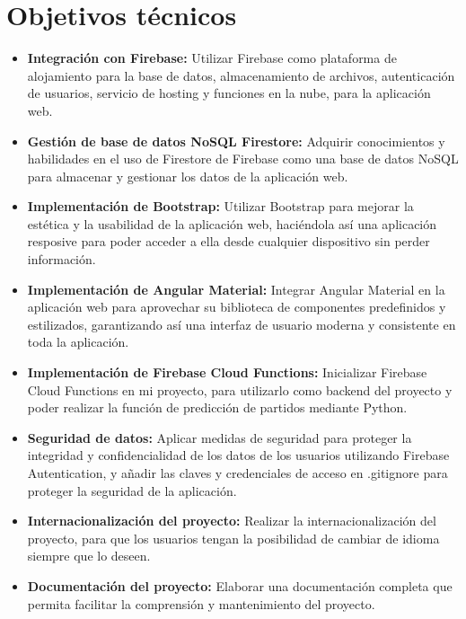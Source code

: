 \section{Objetivos técnicos}
\begin{itemize}
\tightlist
    \item
        \textbf{Integración con Firebase:} Utilizar Firebase como plataforma de alojamiento para la base de datos, almacenamiento de archivos, autenticación de usuarios, servicio de hosting y funciones en la nube, para la aplicación web.
    \item 
        \textbf{Gestión de base de datos NoSQL Firestore:} Adquirir conocimientos y habilidades en el uso de Firestore de Firebase como una base de datos NoSQL para almacenar y gestionar los datos de la aplicación web.
    \item 
        \textbf{Implementación de Bootstrap:} Utilizar Bootstrap para mejorar la estética y la usabilidad de la aplicación web, haciéndola así una aplicación resposive para poder acceder a ella desde cualquier dispositivo sin perder información.
    \item 
        \textbf{Implementación de Angular Material:} Integrar Angular Material en la aplicación web para aprovechar su biblioteca de componentes predefinidos y estilizados, garantizando así una interfaz de usuario moderna y consistente en toda la aplicación.
    \item 
        \textbf{Implementación de Firebase Cloud Functions:} Inicializar Firebase Cloud Functions en mi proyecto, para utilizarlo como backend del proyecto y poder realizar la función de predicción de partidos mediante Python.
    \item 
        \textbf{Seguridad de datos:} Aplicar medidas de seguridad para proteger la integridad y confidencialidad de los datos de los usuarios utilizando Firebase Autentication, y añadir las claves y credenciales de acceso en .gitignore para proteger la seguridad de la aplicación.
    \item 
        \textbf{Internacionalización del proyecto:} Realizar la internacionalización del proyecto, para que los usuarios tengan la posibilidad de cambiar de idioma siempre que lo deseen.
    \item 
        \textbf{Documentación del proyecto:} Elaborar una documentación completa que permita facilitar la comprensión y mantenimiento del proyecto.
\end{itemize}

